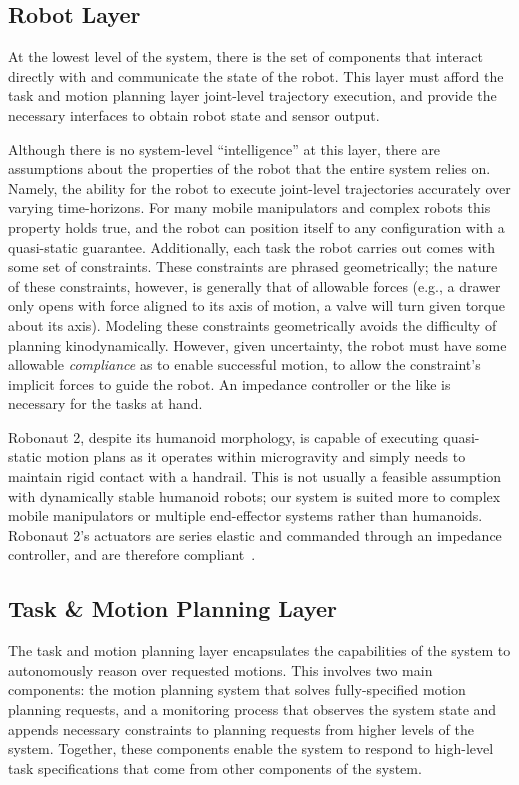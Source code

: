 \subsection{Robot Layer}
At the lowest level of the system, there is the set of components that interact directly with and communicate the state of the robot.
This layer must afford the task and motion planning layer joint-level trajectory execution, and provide the necessary interfaces to obtain robot state and sensor output.

Although there is no system-level ``intelligence'' at this layer, there are assumptions about the properties of the robot that the entire system relies on.
Namely, the ability for the robot to execute joint-level trajectories accurately over varying time-horizons.
For many mobile manipulators and complex robots this property holds true, and the robot can position itself to any configuration with a quasi-static guarantee.
Additionally, each task the robot carries out comes with some set of constraints.
These constraints are phrased geometrically; the nature of these constraints, however, is generally that of allowable forces (e.g., a drawer only opens with force aligned to its axis of motion, a valve will turn given torque about its axis).
Modeling these constraints geometrically avoids the difficulty of planning kinodynamically.
However, given uncertainty, the robot must have some allowable \emph{compliance} as to enable successful motion, to allow the constraint's implicit forces to guide the robot.
An impedance controller or the like is necessary for the tasks at hand.

Robonaut 2, despite its humanoid morphology, is capable of executing quasi-static motion plans as it operates within microgravity and simply needs to maintain rigid contact with a handrail.
This is not usually a feasible assumption with dynamically stable humanoid robots; our system is suited more to complex mobile manipulators or multiple end-effector systems rather than humanoids.
Robonaut 2's actuators are series elastic and commanded through an impedance controller, and are therefore compliant~\cite{diftler2003evolution, Badger2014advancing}.

\subsection{Task \& Motion Planning Layer}
The task and motion planning layer encapsulates the capabilities of the system to autonomously reason over requested motions.
This involves two main components:
  the motion planning system that solves fully-specified motion planning requests,
  and a monitoring process that observes the system state and appends necessary constraints to planning requests from higher levels of the system.
Together, these components enable the system to respond to high-level task specifications that come from other components of the system.

